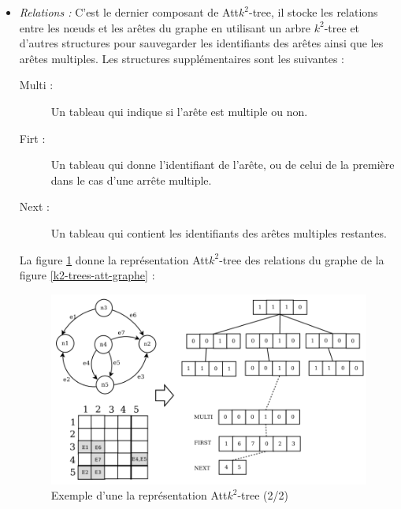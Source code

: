 \begin{itemize}
\item \textit{Relations :} C'est le dernier composant de Att$k^2$-tree, il stocke les relations entre les nœuds et les arêtes du graphe en utilisant un arbre $k^2$-tree et d'autres structures pour sauvegarder les identifiants des arêtes ainsi que les arêtes multiples. Les structures supplémentaires sont les suivantes :
\begin{description}
\item[Multi :] Un tableau qui indique si l'arête est multiple ou non.
\item[Firt :] Un tableau qui donne l'identifiant de l'arête, ou de celui de la première dans le cas d'une arrête multiple.
\item[Next :] Un tableau qui contient les identifiants des arêtes multiples restantes.
\end{description}
La figure \ref{k2-trees-att-relation} donne la représentation Att$k^2$-tree des relations du graphe de la figure \ref{k2-trees-att-graphe} \citep{alvarez2018compact}:
\begin{figure}[H]
\begin{center}
\includegraphics[height=200 pt, width=280 pt]{./ressources/image/k2-trees-att-relation.png} 
\end{center}
\caption{Exemple d'une la représentation Att$k^2$-tree (2/2)}
\label{k2-trees-att-relation}
\end{figure} 
\end{itemize}

